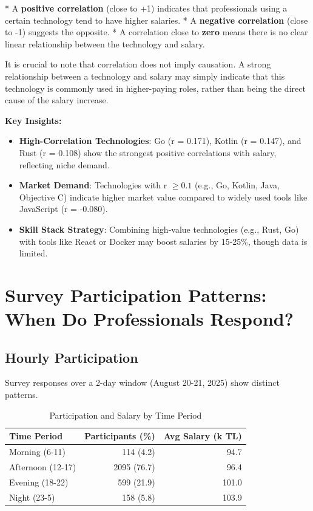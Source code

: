 \documentclass[12pt,a4paper]{article}
\begin{document}
* A \textbf{positive correlation} (close to +1) indicates that professionals using a certain technology tend to have higher salaries.
* A \textbf{negative correlation} (close to -1) suggests the opposite.
* A correlation close to \textbf{zero} means there is no clear linear relationship between the technology and salary.

It is crucial to note that correlation does not imply causation. A strong relationship between a technology and salary may simply indicate that this technology is commonly used in higher-paying roles, rather than being the direct cause of the salary increase.

\textbf{Key Insights:}
\begin{itemize}
    \item \textbf{High-Correlation Technologies}: Go (r = 0.171), Kotlin (r = 0.147), and Rust (r = 0.108) show the strongest positive correlations with salary, reflecting niche demand.
    \item \textbf{Market Demand}: Technologies with r \(\geq 0.1\) (e.g., Go, Kotlin, Java, Objective C) indicate higher market value compared to widely used tools like JavaScript (r = -0.080).
    \item \textbf{Skill Stack Strategy}: Combining high-value technologies (e.g., Rust, Go) with tools like React or Docker may boost salaries by 15-25\%, though data is limited.
\end{itemize}

\section{Survey Participation Patterns: When Do Professionals Respond?}

\subsection{Hourly Participation}
Survey responses over a 2-day window (August 20-21, 2025) show distinct patterns.

\begin{table}[H]
	\centering
	\small
	\begin{tabular}{lrr}
		\toprule
		\textbf{Time Period} & \textbf{Participants (\%)} & \textbf{Avg Salary (k TL)} \\
		\midrule
		Morning (6-11)       & 114 (4.2)                  & 94.7                       \\
		Afternoon (12-17)    & 2095 (76.7)                & 96.4                       \\
		Evening (18-22)      & 599 (21.9)                 & 101.0                      \\
		Night (23-5)         & 158 (5.8)                  & 103.9                      \\
		\bottomrule
	\end{tabular}
	\caption{Participation and Salary by Time Period}
\end{table}
\end{document}
